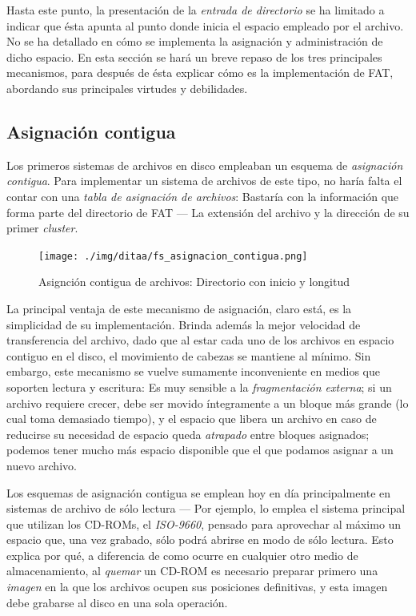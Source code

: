 \documentclass[11pt,fleqn]{book} %
\begin{document}
Hasta este punto, la presentación de la \emph{entrada de directorio} se ha
limitado a indicar que ésta apunta al punto donde inicia el espacio
empleado por el archivo. No se ha detallado en cómo se implementa la
asignación y administración de dicho espacio. En esta sección se hará
un breve repaso de los tres principales mecanismos, para después de
ésta explicar cómo es la implementación de FAT, abordando sus
principales virtudes y debilidades.
\subsection{Asignación contigua}
\label{sec-7-2-1}


Los primeros sistemas de archivos en disco empleaban un esquema de
\emph{asignación contigua}. Para implementar un sistema de archivos de este
tipo, no haría falta el contar con una \emph{tabla de asignación de archivos}: Bastaría con la información que forma parte del
directorio de FAT — La extensión del archivo y la dirección de su
primer \emph{cluster}.

\begin{figure}[htb]
\centering
\texttt{[image: ./img/ditaa/fs\_asignacion\_contigua.png]}
\caption{\label{FS_fs_asignacion_contigua}Asignción contigua de archivos: Directorio con inicio y longitud}
\end{figure}

La principal ventaja de este mecanismo de asignación, claro está, es
la simplicidad de su implementación. Brinda además la mejor velocidad
de transferencia del archivo, dado que al estar cada uno de los
archivos en espacio contiguo en el disco, el movimiento de cabezas se
mantiene al mínimo. Sin embargo, este mecanismo se vuelve sumamente
inconveniente en medios que soporten lectura y escritura: Es muy
sensible a la \emph{fragmentación externa}; si un archivo requiere crecer,
debe ser movido íntegramente a un bloque más grande (lo cual toma
demasiado tiempo), y el espacio que libera un archivo en caso de
reducirse su necesidad de espacio queda \emph{atrapado} entre bloques
asignados; podemos tener mucho más espacio disponible que el que
podamos asignar a un nuevo archivo.

Los esquemas de asignación contigua se emplean hoy en día
principalmente en sistemas de archivo de sólo lectura — Por ejemplo,
lo emplea el sistema principal que utilizan los CD-ROMs, el
\emph{ISO-9660}, pensado para aprovechar al máximo un espacio que, una vez
grabado, sólo podrá abrirse en modo de sólo lectura. Esto explica por
qué, a diferencia de como ocurre en cualquier otro medio de
almacenamiento, al \emph{quemar} un CD-ROM es necesario preparar primero
una \emph{imagen} en la que los archivos ocupen sus posiciones definitivas,
y esta imagen debe grabarse al disco en una sola operación.
\end{document}
